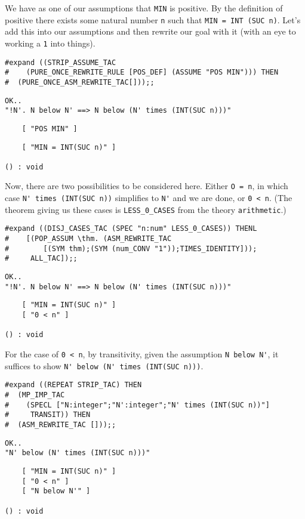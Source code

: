 We have as one of our assumptions that {\small\verb+MIN+} is positive.
By the definition of positive there exists some natural number
{\small\tt n} such that {\small\verb+MIN = INT (SUC n)+}.  Let's add
this into our assumptions and then rewrite our goal with it (with an
eye to working a {\small\tt 1} into things). 
\begin{session}
\begin{verbatim}
#expand ((STRIP_ASSUME_TAC
#    (PURE_ONCE_REWRITE_RULE [POS_DEF] (ASSUME "POS MIN"))) THEN
#  (PURE_ONCE_ASM_REWRITE_TAC[]));;
\end{verbatim}
\mvdots
\begin{verbatim}
OK..
"!N'. N below N' ==> N below (N' times (INT(SUC n)))"
\end{verbatim}
\mvdots
\begin{verbatim}
    [ "POS MIN" ]
\end{verbatim}
\mvdots
\begin{verbatim}
    [ "MIN = INT(SUC n)" ]

() : void
\end{verbatim}
\end{session}

Now, there are two possibilities to be considered here.  Either
{\small\verb+O = n+}, in which case {\small\verb+N' times (INT(SUC n))+} 
simplifies to {\small\verb+N'+} and we are done, or {\small\verb+0 < n+}.
(The theorem giving us these cases is {\small\verb+LESS_0_CASES+} from
the theory {\small\verb+arithmetic+}.) 
\begin{session}
\begin{verbatim}
#expand ((DISJ_CASES_TAC (SPEC "n:num" LESS_0_CASES)) THENL
#    [(POP_ASSUM \thm. (ASM_REWRITE_TAC
#        [(SYM thm);(SYM (num_CONV "1"));TIMES_IDENTITY]));
#     ALL_TAC]);;
\end{verbatim}
\mvdots
\begin{verbatim}
OK..
"!N'. N below N' ==> N below (N' times (INT(SUC n)))"
\end{verbatim}
\mvdots
\begin{verbatim}
    [ "MIN = INT(SUC n)" ]
    [ "0 < n" ]

() : void
\end{verbatim}
\end{session}

For the case of {\small\verb+0 < n+}, by transitivity, given the
assumption {\small\verb+N below N'+}, it suffices to show
{\small\verb+N' below (N' times (INT(SUC n)))+}.
\begin{session}
\begin{verbatim}
#expand ((REPEAT STRIP_TAC) THEN
#  (MP_IMP_TAC
#    (SPECL ["N:integer";"N':integer";"N' times (INT(SUC n))"]
#     TRANSIT)) THEN
#  (ASM_REWRITE_TAC []));;
\end{verbatim}
\mvdots
\begin{verbatim}
OK..
"N' below (N' times (INT(SUC n)))"
\end{verbatim}
\mvdots
\begin{verbatim}
    [ "MIN = INT(SUC n)" ]
    [ "0 < n" ]
    [ "N below N'" ]

() : void
\end{verbatim}
\end{session}


